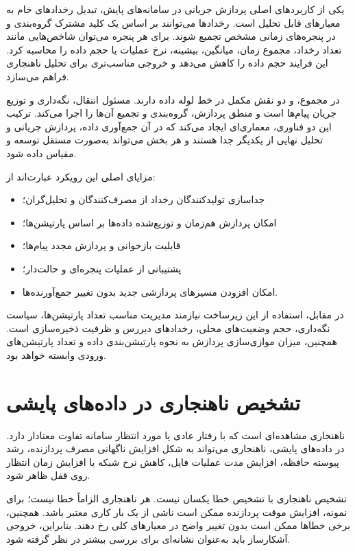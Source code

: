 یکی از کاربردهای اصلی پردازش جریانی در سامانه‌های پایش، تبدیل رخدادهای خام به
معیارهای قابل تحلیل است. رخدادها می‌توانند بر اساس یک کلید مشترک گروه‌بندی و در
پنجره‌های زمانی مشخص تجمیع شوند. برای هر پنجره می‌توان شاخص‌هایی مانند تعداد
رخداد، مجموع زمان، میانگین، بیشینه، نرخ عملیات یا حجم داده را محاسبه کرد. این
فرایند حجم داده را کاهش می‌دهد و خروجی مناسب‌تری برای تحلیل ناهنجاری فراهم
می‌سازد.

در مجموع،  و  دو نقش مکمل در خط لوله داده دارند.
 مسئول انتقال، نگه‌داری و توزیع جریان پیام‌ها است و
 منطق پردازش، گروه‌بندی و تجمیع آن‌ها را اجرا می‌کند. ترکیب
این دو فناوری، معماری‌ای ایجاد می‌کند که در آن جمع‌آوری داده، پردازش جریانی و
تحلیل نهایی از یکدیگر جدا هستند و هر بخش می‌تواند به‌صورت مستقل توسعه و مقیاس
داده شود.

مزایای اصلی این رویکرد عبارت‌اند از:

\begin{itemize}
    \item جداسازی تولیدکنندگان رخداد از مصرف‌کنندگان و تحلیل‌گران؛
    \item امکان پردازش هم‌زمان و توزیع‌شده داده‌ها بر اساس پارتیشن‌ها؛
    \item قابلیت بازخوانی و پردازش مجدد پیام‌ها؛
    \item پشتیبانی از عملیات پنجره‌ای و حالت‌دار؛
    \item امکان افزودن مسیرهای پردازشی جدید بدون تغییر جمع‌آورنده‌ها.
\end{itemize}

در مقابل، استفاده از این زیرساخت نیازمند مدیریت مناسب تعداد پارتیشن‌ها، سیاست
نگه‌داری، حجم وضعیت‌های محلی، رخدادهای دیررس و ظرفیت ذخیره‌سازی است. همچنین،
میزان موازی‌سازی پردازش به نحوه پارتیشن‌بندی داده و تعداد پارتیشن‌های ورودی
وابسته خواهد بود.

\section{تشخیص ناهنجاری در داده‌های پایشی}
\label{sec:anomaly-detection}

ناهنجاری مشاهده‌ای است که با رفتار عادی یا مورد انتظار
سامانه تفاوت معنادار دارد. در داده‌های پایشی، ناهنجاری می‌تواند به شکل افزایش
ناگهانی مصرف پردازنده، رشد پیوسته حافظه، افزایش مدت عملیات فایل، کاهش نرخ شبکه
یا افزایش زمان انتظار روی قفل ظاهر شود.

تشخیص ناهنجاری با تشخیص خطا یکسان نیست. هر ناهنجاری الزاماً خطا نیست؛ برای
نمونه، افزایش موقت پردازنده ممکن است ناشی از یک بار کاری معتبر باشد. همچنین،
برخی خطاها ممکن است بدون تغییر واضح در معیارهای کلی رخ دهند. بنابراین، خروجی
آشکارساز باید به‌عنوان نشانه‌ای برای بررسی بیشتر در نظر گرفته شود.

